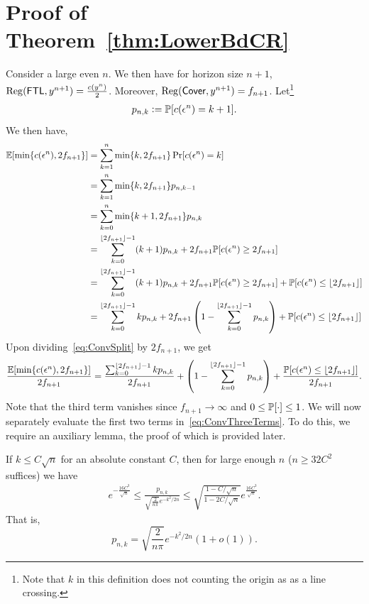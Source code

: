 \section{Proof of Theorem~\ref{thm:LowerBdCR}} \label{appendix:ConversePf}
    Consider a large even $n$. We then have for horizon size $n+1$, $\mathrm{Reg}(\mathsf{FTL},y^{n+1}) = \frac{c(y^n)}{2}$.  Moreover, $\mathrm{Reg}(\mathsf{Cover},y^{n+1}) = f_{n+1}$. Let\footnote{Note that $k$ in this definition does not counting the origin as as a line crossing.}
    \begin{align}\label{eq:PnkDefn}
        p_{n,k} \mathrel{\mathop{:}}= \mathbb{P}[c(\epsilon^{n}) = k+1].
    \end{align}
    We then have,
    \begin{align}
     \operatorname{\mathbb{E}}[\min\{c(\epsilon^n), 2f_{n+1}\}] &= \sum_{k=1}^n \min\{k, 2f_{n+1}\} \Pr[c(\epsilon^n) = k]\nonumber\\
        &= \sum_{k=1}^n \min\{k, 2f_{n+1}\} p_{n,k-1} \nonumber\\
        &= \sum_{k=0}^n \min\{k+1,2f_{n+1}\}p_{n,k} \nonumber\\
        &= \sum_{k=0}^{\lfloor 2f_{n+1} \rfloor-1} (k+1)p_{n,k} + 2f_{n+1} \mathbb{P}[c(\epsilon^n) \ge 2f_{n+1}] \nonumber\\
        &= \sum_{k=0}^{\lfloor 2f_{n+1} \rfloor-1} (k+1)p_{n,k} + 2f_{n+1} \mathbb{P}[c(\epsilon^n) \ge 2f_{n+1}] + \mathbb{P}[c(\epsilon^n) \le \lfloor 2f_{n+1}\rfloor] \nonumber\\
        &=  \sum_{k=0}^{\lfloor 2f_{n+1} \rfloor-1} kp_{n,k} + 2f_{n+1} \left(1-\sum_{k=0}^{\lfloor 2f_{n+1} \rfloor-1} p_{n,k}\right) +  \mathbb{P}[c(\epsilon^n) \le \lfloor 2f_{n+1}\rfloor] \label{eq:ConvSplit}
    \end{align} 
    Upon dividing~\cref{eq:ConvSplit} by $2f_{n+1}$, we get 
    \begin{align} \label{eq:ConvThreeTerms}
      \frac{\operatorname{\mathbb{E}}[\min\{c(\epsilon^n), 2f_{n+1}\}]}{2f_{n+1}}  = \frac{\sum_{k=0}^{\lfloor 2f_{n+1} \rfloor-1} kp_{n,k}}{2f_{n+1}} +  \left(1-\sum_{k=0}^{\lfloor 2f_{n+1} \rfloor-1} p_{n,k}\right) +  \frac{\mathbb{P}[c(\epsilon^n) \le \lfloor 2f_{n+1}\rfloor]}{2f_{n+1}}.
    \end{align}
    Note that the third term vanishes since $f_{n+1} \to \infty$ and $0 \le \mathbb{P}[\cdot] \le 1$. We will now separately evaluate the first two terms in~\cref{eq:ConvThreeTerms}. To do this, we require an auxiliary lemma, the proof of which is provided later.
    \begin{lemma}\label{lem:pnkasymptotics}
        If $k \le C\sqrt{n}$ for an absolute constant $C$, then for large enough $n$ ($n \ge 32C^2$ suffices) we have
        \begin{align}\label{eq:pnkDensityApprox}
            e^{-\frac{16C^3}{\sqrt{n}}} \le \frac{p_{n,k}}{\sqrt{\frac{2}{n\pi}}e^{-k^2/2n}} \le \sqrt{\frac{1-C/\sqrt{n}}{1-2C/\sqrt{n}}} e^{\frac{16C^3}{\sqrt{n}}}.
        \end{align}
        That is,
        \[
        p_{n,k} = \sqrt{\frac{2}{n\pi}}e^{-k^2/2n} (1+o(1)).
        \]
    \end{lemma}
